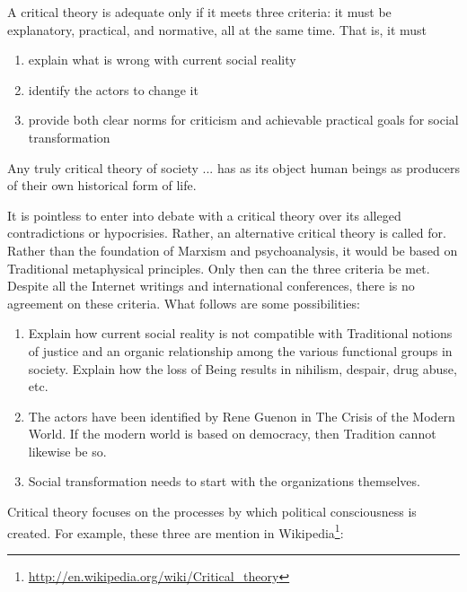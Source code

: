 \begin{quotex}
A critical theory is adequate only if it meets three criteria: it must be explanatory, practical, and normative, all at the same time. That is, it must

\begin{enumerate}


\item explain what is wrong with current social reality

\item identify the actors to change it

\item provide both clear norms for criticism and achievable practical goals for social transformation
\end{enumerate}

Any truly critical theory of society ... has as its object human beings as producers of their own historical form of life.
\end{quotex}


It is pointless to enter into debate with a critical theory over its alleged contradictions or hypocrisies. Rather, an alternative critical theory is called for. Rather than the foundation of Marxism and psychoanalysis, it would be based on Traditional metaphysical principles. Only then can the three criteria be met. Despite all the Internet writings and international conferences, there is no agreement on these criteria. What follows are some possibilities:

\begin{enumerate}


\item Explain how current social reality is not compatible with Traditional notions of justice and an organic relationship among the various functional groups in society. Explain how the loss of Being results in nihilism, despair, drug abuse, etc.

\item The actors have been identified by Rene Guenon in The Crisis of the Modern World. If the modern world is based on democracy, then Tradition cannot likewise be so.

\item Social transformation needs to start with the organizations themselves.
\end{enumerate}


Critical theory focuses on the processes by which political consciousness is created. For example, these three are mention in Wikipedia\footnote{\url{http://en.wikipedia.org/wiki/Critical\_theory}}:

